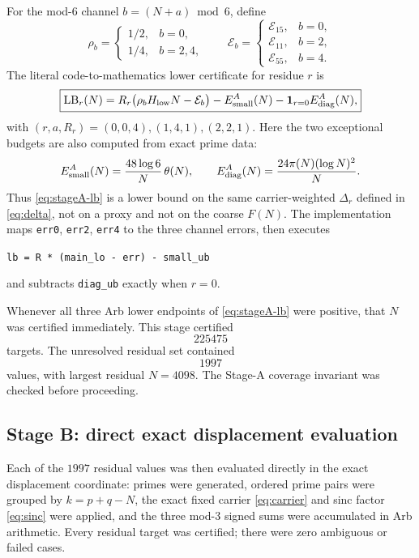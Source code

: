 \documentclass[11pt]{article}
\theoremstyle{definition}
\begin{document}
For the mod-$6$ channel $b=(N+a)\bmod6$, define
\[
\rho_b=\begin{cases}1/2,&b=0,\\1/4,&b=2,4,\end{cases}
\qquad
\mathcal E_b=\begin{cases}\mathcal E_{15},&b=0,\\\mathcal E_{11},&b=2,\\\mathcal E_{55},&b=4.\end{cases}
\]
The literal code-to-mathematics lower certificate for residue $r$ is
\begin{equation}\label{eq:stageA-lb}
\boxed{
\mathrm{LB}_r(N)
=R_r\bigl(\rho_b H_{\rm low}N-\mathcal E_b\bigr)
-E_{\rm small}^{A}(N)
-\mathbf1_{r=0}E_{\rm diag}^{A}(N),
}
\end{equation}
with $(r,a,R_r)=(0,0,4),(1,4,1),(2,2,1)$. Here the two exceptional budgets are also computed from exact prime data:
\[
E_{\rm small}^{A}(N)=\frac{48\log6}{N}\,\theta(N),
\qquad
E_{\rm diag}^{A}(N)=\frac{24\pi(N)(\log N)^2}{N}.
\]
Thus \eqref{eq:stageA-lb} is a lower bound on the same carrier-weighted $\Delta_r$ defined in \eqref{eq:delta}, not on a proxy and not on the coarse $F(N)$. The implementation maps \texttt{err0}, \texttt{err2}, \texttt{err4} to the three channel errors, then executes
\begin{center}
\texttt{lb = R * (main\_lo - err) - small\_ub}
\end{center}
and subtracts \texttt{diag\_ub} exactly when $r=0$.

Whenever all three Arb lower endpoints of \eqref{eq:stageA-lb} were positive, that $N$ was certified immediately. This stage certified
\[
225475
\]
targets. The unresolved residual set contained
\[
1997
\]
values, with largest residual $N=4098$. The Stage-A coverage invariant was checked before proceeding.

\subsection{Stage B: direct exact displacement evaluation}

Each of the $1997$ residual values was then evaluated directly in the exact displacement coordinate: primes were generated, ordered prime pairs were grouped by $k=p+q-N$, the exact fixed carrier \eqref{eq:carrier} and sinc factor \eqref{eq:sinc} were applied, and the three mod-$3$ signed sums were accumulated in Arb arithmetic. Every residual target was certified; there were zero ambiguous or failed cases.
\end{document}
